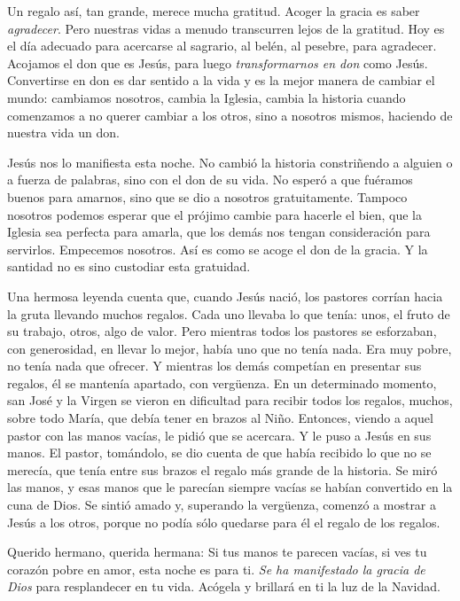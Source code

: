 \documentclass[]{article}
\begin{document}
Un regalo así, tan grande, merece mucha gratitud. Acoger la gracia es
saber \emph{agradecer}. Pero nuestras vidas a menudo transcurren lejos
de la gratitud. Hoy es el día adecuado para acercarse al sagrario, al
belén, al pesebre, para agradecer. Acojamos el don que es Jesús, para
luego \emph{transformarnos en don} como Jesús. Convertirse en don es dar
sentido a la vida y es la mejor manera de cambiar el mundo: cambiamos
nosotros, cambia la Iglesia, cambia la historia cuando comenzamos a no
querer cambiar a los otros, sino a nosotros mismos, haciendo de nuestra
vida un don.

Jesús nos lo manifiesta esta noche. No cambió la historia constriñendo a
alguien o a fuerza de palabras, sino con el don de su vida. No esperó a
que fuéramos buenos para amarnos, sino que se dio a nosotros
gratuitamente. Tampoco nosotros podemos esperar que el prójimo cambie
para hacerle el bien, que la Iglesia sea perfecta para amarla, que los
demás nos tengan consideración para servirlos. Empecemos nosotros. Así
es como se acoge el don de la gracia. Y la santidad no es sino custodiar
esta gratuidad.

Una hermosa leyenda cuenta que, cuando Jesús nació, los pastores corrían
hacia la gruta llevando muchos regalos. Cada uno llevaba lo que tenía:
unos, el fruto de su trabajo, otros, algo de valor. Pero mientras todos
los pastores se esforzaban, con generosidad, en llevar lo mejor, había
uno que no tenía nada. Era muy pobre, no tenía nada que ofrecer. Y
mientras los demás competían en presentar sus regalos, él se mantenía
apartado, con vergüenza. En un determinado momento, san José y la Virgen
se vieron en dificultad para recibir todos los regalos, muchos, sobre
todo María, que debía tener en brazos al Niño. Entonces, viendo a aquel
pastor con las manos vacías, le pidió que se acercara. Y le puso a Jesús
en sus manos. El pastor, tomándolo, se dio cuenta de que había recibido
lo que no se merecía, que tenía entre sus brazos el regalo más grande de
la historia. Se miró las manos, y esas manos que le parecían siempre
vacías se habían convertido en la cuna de Dios. Se sintió amado y,
superando la vergüenza, comenzó a mostrar a Jesús a los otros, porque no
podía sólo quedarse para él el regalo de los regalos.

Querido hermano, querida hermana: Si tus manos te parecen vacías, si ves
tu corazón pobre en amor, esta noche es para ti. \emph{Se ha manifestado
la gracia de Dios} para resplandecer en tu vida. Acógela y brillará en
ti la luz de la
Navidad.\protect\hypertarget{_Toc448662789}{}{\protect\hypertarget{_Toc448690308}{}{\protect\hypertarget{_Toc448708331}{}{\protect\hypertarget{_Toc448709417}{}{\protect\hypertarget{_Toc449554419}{}{}}}}}
\end{document}
